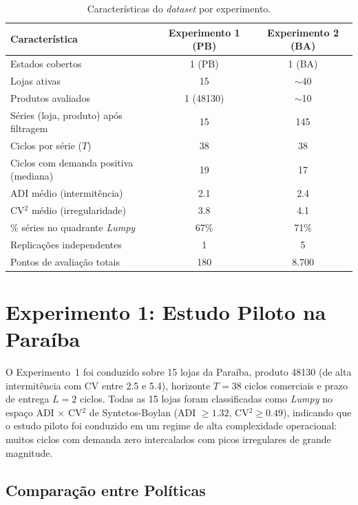 \begin{table}[ht]
\centering
\small
\caption{Características do \textit{dataset} por experimento.}
\label{tab:dataset_stats}
\begin{tabular}{@{}lcc@{}}
\toprule
Característica & Experimento 1 (PB) & Experimento 2 (BA) \\
\midrule
Estados cobertos                      & 1 (PB)    & 1 (BA) \\
Lojas ativas                          & 15        & $\sim$40 \\
Produtos avaliados                   & 1 (48130) & $\sim$10 \\
Séries (loja, produto) após filtragem     & 15        & 145 \\
Ciclos por série ($T$)                & 38        & 38 \\
Ciclos com demanda positiva (mediana) & 19        & 17 \\
ADI médio (intermitência)             & 2.1       & 2.4 \\
CV$^2$ médio (irregularidade)         & 3.8       & 4.1 \\
\% séries no quadrante \textit{Lumpy} & 67\%      & 71\% \\
Replicações independentes             & 1         & 5 \\
Pontos de avaliação totais            & 180       & 8.700 \\
\bottomrule
\end{tabular}
\end{table}

\section{Experimento 1: Estudo Piloto na Paraíba}
\label{sec:experimento1}

O Experimento~1 foi conduzido sobre 15 lojas da Paraíba, produto 48130 (de alta intermitência com CV entre 2.5 e 5.4), horizonte $T=38$ ciclos comerciais e prazo de entrega $L=2$ ciclos. Todas as 15 lojas foram classificadas como \textit{Lumpy} no espaço ADI $\times$ CV$^2$ de Syntetos-Boylan (ADI $\geq 1.32$, CV$^2 \geq 0.49$), indicando que o estudo piloto foi conduzido em um regime de alta complexidade operacional: muitos ciclos com demanda zero intercalados com picos irregulares de grande magnitude.

\subsection{Comparação entre Políticas}

